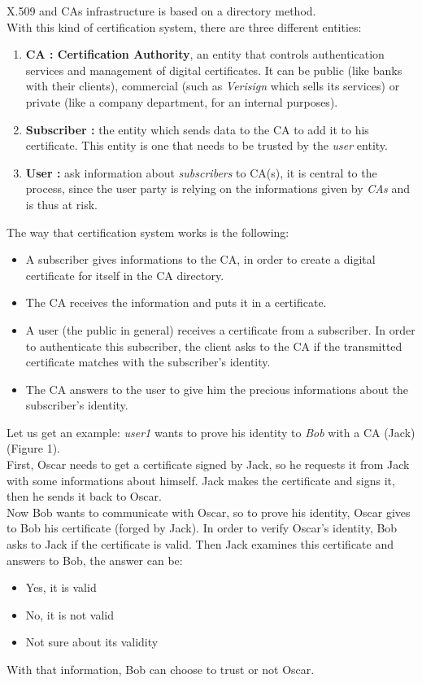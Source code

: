 \documentclass[journal, a4paper]{IEEEtran}
\begin{document}
X.509 and CAs\cite{rfc3647} infrastructure is based on a directory method.\\
With this kind of certification system, there are three different entities:

\begin{enumerate}
	\item \textbf{CA : Certification Authority}, an entity that controls authentication services and management of digital certificates. It can be public (like banks with their clients), commercial (such as \textit{Verisign} which sells its services) or private (like a company department, for an internal purposes).
	\item \textbf{Subscriber :} the entity which sends data to the CA to add it to his certificate. This entity is one that needs to be trusted by the \textit{user} entity.
	\item \textbf{User :} ask information about \textit{subscribers} to CA(s), it is central to the process, since the user party is relying on the informations given by \textit{CAs} and is thus at risk.
\end{enumerate}

The way that certification system works is the following:
\begin{itemize}
	\item A subscriber gives informations to the CA, in order to create a digital certificate for itself in the CA directory.
	\item The CA receives the information and puts it in a certificate.
	\item A user (the public in general) receives a certificate from a subscriber. In order to authenticate this subscriber, the client asks to the CA if the transmitted certificate matches with the subscriber's identity.
	\item The CA answers to the user to give him the precious informations about the subscriber's identity.
\end{itemize}

Let us get an example: \textit{user1} wants to prove his identity to \textit{Bob} with a CA (Jack) (Figure 1).\\
First, Oscar needs to get a certificate signed by Jack, so he requests it from Jack with some informations about himself. Jack makes the certificate and signs it, then he sends it back to Oscar.\\
Now Bob wants to communicate with Oscar, so to prove his identity, Oscar gives to Bob his certificate (forged by Jack). In order to verify Oscar's identity, Bob asks to Jack if the certificate is valid. Then Jack examines this certificate and answers to Bob, the answer can be:
\begin{itemize}
	\item Yes, it is valid
	\item No, it is not valid
	\item Not sure about its validity
\end{itemize}
With that information, Bob can choose to trust or not Oscar.
\end{document}
